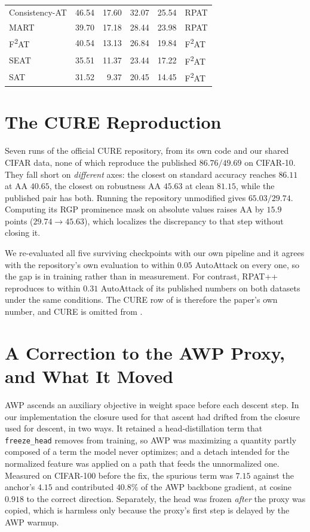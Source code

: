 \documentclass{article} %
\theoremstyle{plain}
\begin{document}
\begin{table}[!htbp]
\begin{tabular}{lrrrrl}
    Consistency-AT             & 46.54 & 17.60 & 32.07 & 25.54 & RPAT \\
    MART                       & 39.70 & 17.18 & 28.44 & 23.98 & RPAT \\
    F\textsuperscript{2}AT     & 40.54 & 13.13 & 26.84 & 19.84 & F\textsuperscript{2}AT \\
    SEAT                       & 35.51 & 11.37 & 23.44 & 17.22 & F\textsuperscript{2}AT \\
    SAT                        & 31.52 &  9.37 & 20.45 & 14.45 & F\textsuperscript{2}AT \\
    \bottomrule
  \end{tabular}
\end{table}

\section{The CURE Reproduction}
\label{app:cure}

Seven runs of the official CURE repository, from its own code and our shared CIFAR data, none of which
reproduce the published $86.76 / 49.69$ on CIFAR-10. They fall short on \emph{different} axes: the
closest on standard accuracy reaches $86.11$ at AA $40.65$, the closest on robustness AA $45.63$ at
clean $81.15$, while the published pair has both. Running the repository unmodified gives
$65.03 / 29.74$. Computing its RGP prominence mask on absolute values raises AA by $15.9$ points
($29.74 \to 45.63$), which localizes the discrepancy to that step without closing it.

We re-evaluated all five surviving checkpoints with our own pipeline and it agrees with the
repository's own evaluation to within $0.05$ AutoAttack on every one, so the gap is in training rather
than in measurement. For contrast, RPAT++ reproduces to within $0.31$ AutoAttack of its published
numbers on both datasets under the same conditions. The CURE row of  is therefore
the paper's own number, and CURE is omitted from .

\section{A Correction to the AWP Proxy, and What It Moved}
\label{app:awp}

AWP ascends an auxiliary objective in weight space before each descent step. In our implementation the
closure used for that ascent had drifted from the closure used for descent, in two ways. It retained a
head-distillation term that \texttt{freeze\_head} removes from training, so AWP was maximizing a
quantity partly composed of a term the model never optimizes; and a detach intended for the normalized
feature was applied on a path that feeds the unnormalized one. Measured on CIFAR-100 before the fix,
the spurious term was $7.15$ against the anchor's $4.15$ and contributed $40.8\%$ of the AWP backbone
gradient, at cosine $0.918$ to the correct direction. Separately, the head was frozen \emph{after} the
proxy was copied, which is harmless only because the proxy's first step is delayed by the AWP warmup.
\end{document}
